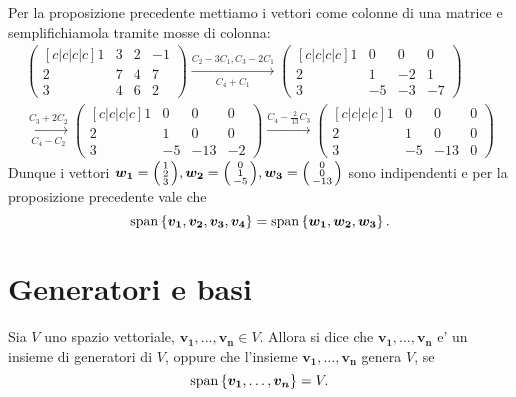 \begin{solution}
    Per la proposizione precedente mettiamo i vettori come colonne di una matrice e semplifichiamola tramite mosse di colonna:
    \begin{gather*}
        \begin{pmatrix}[c|c|c|c]
            1 & 3 & 2 & -1 \\ 2 & 7 & 4 & 7 \\ 3 & 4 & 6 & 2
        \end{pmatrix} \xrightarrow[C_4 + C_1]{C_2 - 3C_1, C_3 - 2C_1} \begin{pmatrix}
            [c|c|c|c]
            1 & 0 & 0 & 0 \\ 2 & 1 & -2 & 1 \\ 3 & -5 & -3 & -7
        \end{pmatrix} \\ 
        \xrightarrow[C_4 - C_2]{C_3 + 2C_2} \begin{pmatrix}
            [c|c|c|c]
            1 & 0 & 0 & 0 \\ 2 & 1 & 0 & 0 \\ 3 & -5 & -13 & -2
        \end{pmatrix} \xrightarrow[]{C_4 - \frac{2}{13}C_3} \begin{pmatrix}
            [c|c|c|c]
            1 & 0 & 0 & 0 \\ 2 & 1 & 0 & 0 \\ 3 & -5 & -13 & 0
        \end{pmatrix}
    \end{gather*}
    Dunque i vettori $\bm{w_1} = \begin{psmallmatrix} 1 \\ 2 \\ 3 \end{psmallmatrix}, \bm{w_2} = \begin{psmallmatrix} 0 \\ 1 \\ -5 \end{psmallmatrix}, \bm{w_3} = \begin{psmallmatrix} 0 \\ 0 \\ -13 \end{psmallmatrix}$ sono indipendenti e per la proposizione precedente vale che \[
        \operatorname{span}\left\{\bm{v_1}, \bm{v_2}, \bm{v_3}, \bm{v_4}\right\} = \operatorname{span}\left\{\bm{w_1}, \bm{w_2}, \bm{w_3}\right\}.
    \]
\end{solution}

\section{Generatori e basi}
\begin{definition}
    Sia $V$ uno spazio vettoriale, $\bm{v_1}, \dots, \bm{v_n} \in V$. Allora si dice che ${\bm{v_1}, \dots, \bm{v_n}}$ e' un insieme di generatori di $V$, oppure che l'insieme ${\bm{v_1}, \dots, \bm{v_n}}$ genera $V$, se
    \begin{equation}
        \operatorname{span}\left\{\bm{v_1}, \dots, \bm{v_n}\right\} = V.
    \end{equation}
\end{definition}

